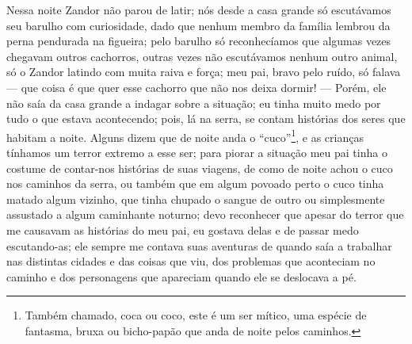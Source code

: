 Nessa noite Zandor não parou de latir; nós desde a casa grande só escutávamos seu barulho com curiosidade, dado que nenhum membro da família lembrou da perna pendurada na figueira; pelo barulho só reconhecíamos que algumas vezes chegavam outros cachorros, outras vezes não escutávamos nenhum outro animal, só o Zandor latindo com muita raiva e força; meu pai, bravo pelo ruído, só falava --- que coisa é que quer esse cachorro que não nos deixa dormir! --- Porém, ele não saía da casa grande a indagar sobre a situação; eu tinha muito medo por tudo o que estava acontecendo; pois, lá na serra, se contam histórias dos seres que habitam a noite. 
Alguns dizem que de noite anda o ``cuco''\footnote{Também chamado, coca ou coco, este é um ser mítico, uma espécie de fantasma, bruxa ou bicho-papão que anda de noite pelos caminhos.}, e as crianças tínhamos um terror extremo a esse ser; para piorar a situação meu pai tinha o costume de contar-nos histórias de suas viagens, de como de noite achou o cuco nos caminhos da serra, ou também que em algum povoado perto o cuco tinha matado algum vizinho, que tinha chupado o sangue de outro ou simplesmente assustado a algum caminhante noturno; devo reconhecer que apesar do terror que me causavam as histórias do meu pai, eu gostava delas e de passar medo escutando-as; ele sempre me contava suas aventuras de quando saía a trabalhar nas distintas cidades e das coisas que viu, dos problemas que aconteciam no caminho e dos personagens que apareciam quando ele se deslocava a pé.


